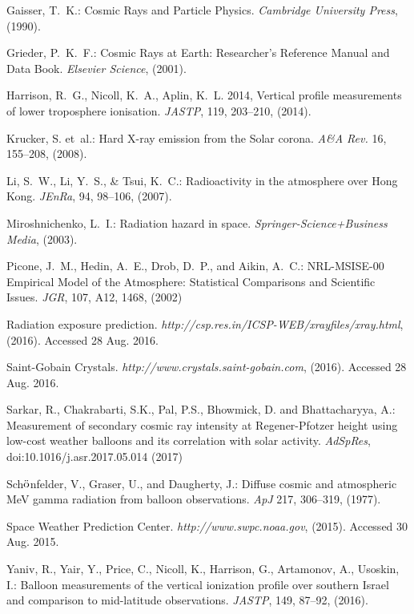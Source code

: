 \begin{thebibliography}{[10]}
 Gaisser, T.~K.: Cosmic
Rays and Particle Physics. \textit{Cambridge University Press}, (1990).

 Grieder, P.~K.~F.: Cosmic
Rays at Earth: Researcher's Reference Manual and Data Book. \textit{Elsevier 
Science}, (2001).

 Harrison, R.~G., Nicoll, K.~A.,
Aplin, K.~L. 2014, Vertical profile measurements of lower troposphere ionisation.
\textit{JASTP}, 119, 203--210, (2014).

 Krucker, S. et~al.: Hard
X-ray emission from the Solar corona. \textit{A\&A Rev.} 16, 155--208, (2008).

 Li, S.~W., Li, Y.~S., \& Tsui, K.~C.: 
Radioactivity in the atmosphere over Hong Kong. \textit{JEnRa}, 94, 98--106, (2007).

 Miroshnichenko, L.~I.:
Radiation hazard in space. \textit{Springer-Science+Business Media}, (2003).

 Picone, J.~M., Hedin, A.~E., 
Drob, D.~P., and Aikin, A.~C.: NRL-MSISE-00 Empirical Model of the Atmosphere: 
Statistical Comparisons and Scientific Issues. \textit{JGR}, 107, A12, 1468, (2002)

 Radiation
exposure prediction. \textit{http://csp.res.in/ICSP-WEB/xrayfiles/xray.html}, 
(2016). Accessed 28 Aug. 2016.

 Saint-Gobain Crystals.
\textit{http://www.crystals.saint-gobain.com}, (2016). Accessed 28 Aug. 2016.

 Sarkar, R., Chakrabarti, S.K., 
Pal, P.S., Bhowmick, D. and Bhattacharyya, A.: Measurement of secondary cosmic ray 
intensity at Regener-Pfotzer height using low-cost weather balloons and its correlation 
with solar activity. \textit{AdSpRes}, doi:10.1016/j.asr.2017.05.014 (2017)

Sch$\ddot{\rm o}$nfelder, V., Graser, U., and Daugherty, J.: Diffuse
cosmic and atmospheric MeV gamma radiation from balloon observations.
\textit{ApJ} 217, 306--319, (1977).

 Space
Weather Prediction Center. \textit{http://www.swpc.noaa.gov}, (2015).
Accessed 30 Aug. 2015.

 Yaniv, R., Yair, Y., Price, C., Nicoll, K.,
Harrison, G., Artamonov, A., Usoskin, I.: Balloon measurements of the
vertical ionization profile over southern Israel and comparison to mid-latitude
observations. \textit{JASTP}, 149, 87--92, (2016).

\end{thebibliography}



